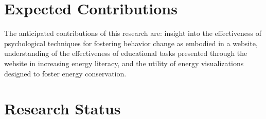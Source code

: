 \documentclass{chi-ext}
\begin{document}
\begin{multicols}{2}
\section{Expected Contributions}


The anticipated contributions of this research are: insight into the effectiveness of psychological techniques for fostering behavior change as embodied in a website, understanding of the effectiveness of educational tasks presented through the website in increasing energy literacy, and the utility of energy visualizations designed to foster energy conservation.

\section{Research Status}


%


\end{multicols}
\end{document}
